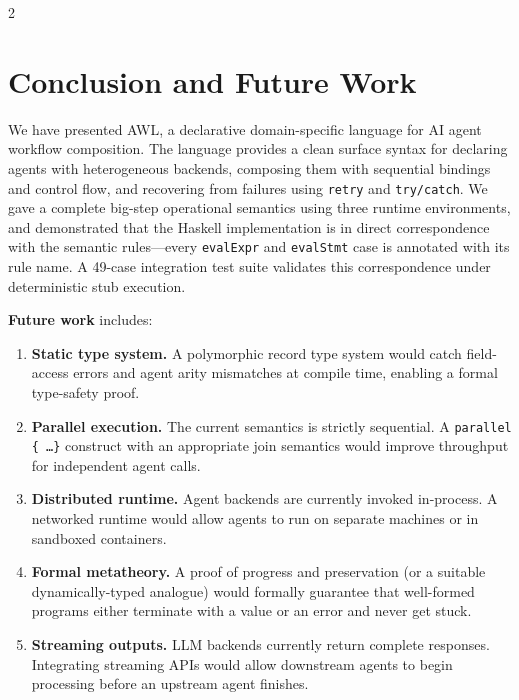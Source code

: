 \documentclass[10pt]{article}
\begin{document}
\begin{multicols}{2}
\section{Conclusion and Future Work}
\label{sec:conclusion}

We have presented AWL, a declarative domain-specific language for AI agent
workflow composition.  The language provides a clean surface syntax for
declaring agents with heterogeneous backends, composing them with
sequential bindings and control flow, and recovering from failures using
\texttt{retry} and \texttt{try/catch}.  We gave a complete big-step
operational semantics using three runtime environments, and demonstrated
that the Haskell implementation is in direct correspondence with the
semantic rules---every \texttt{evalExpr} and \texttt{evalStmt} case is
annotated with its rule name.  A 49-case integration test suite validates
this correspondence under deterministic stub execution.

\medskip
\noindent\textbf{Future work} includes:

\begin{enumerate}
  \item \textbf{Static type system.}  A polymorphic record type system
        would catch field-access errors and agent arity mismatches at
        compile time, enabling a formal type-safety proof.

  \item \textbf{Parallel execution.}  The current semantics is strictly
        sequential.  A \texttt{parallel \{ \ldots \}} construct with an
        appropriate join semantics would improve throughput for independent
        agent calls.

  \item \textbf{Distributed runtime.}  Agent backends are currently
        invoked in-process.  A networked runtime would allow agents to
        run on separate machines or in sandboxed containers.

  \item \textbf{Formal metatheory.}  A proof of progress and preservation
        (or a suitable dynamically-typed analogue) would formally guarantee
        that well-formed programs either terminate with a value or an error
        and never get stuck.

  \item \textbf{Streaming outputs.}  LLM backends currently return
        complete responses.  Integrating streaming APIs would allow
        downstream agents to begin processing before an upstream agent
        finishes.
\end{enumerate}


\end{multicols}
\end{document}
